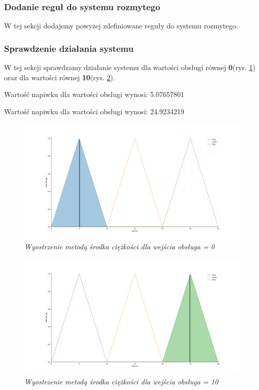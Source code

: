 \documentclass[a4paper, 10pt]{article}
\begin{document}
\subsubsection{Dodanie reguł do systemu rozmytego}\label{p6}

W tej sekcji dodajemy powyżej zdefiniowane reguły do systemu rozmytego.



\subsubsection{Sprawdzenie działania systemu}\label{p7}

W tej sekcji sprawdzamy działanie systemu dla wartości obsługi równej \textbf{0}(rys. \ref{fig:obsluga0}) oraz dla wartości równej \textbf{10}(rys. \ref{fig:obsluga10}).



Wartość napiwku dla wartości obsługi wynosi: 5.07657801

Wartość napiwku dla wartości obsługi wynosi: 24.9234219

\begin{figure}[H]
	\centering
	\includegraphics[scale=0.25]{Figure_3.png}
	\caption{\textit{Wyostrzenie metodą środka ciężkości dla wejścia obsługa = 0}}
	\label{fig:obsluga0}
\end{figure}

\begin{figure}[H]
	\centering
	\includegraphics[scale=0.25]{Figure_4.png}
	\caption{\textit{Wyostrzenie metodą środka ciężkości dla wejścia obsługa = 10}}
	\label{fig:obsluga10}

\end{figure}
\end{document}

